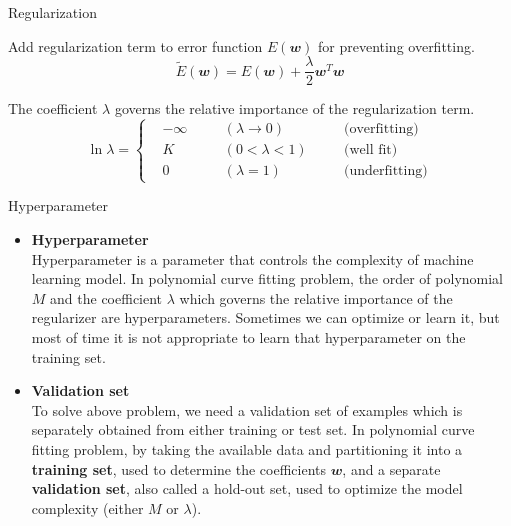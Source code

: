 \documentclass{bredelebeamer}
\begin{document}
\begin{frame}{Regularization}
  \begin{justify}
    Add regularization term to error function $E(\mathbfit{w})$ for preventing
    overfitting.
    \begin{equation}
      \tilde{E}(\mathbfit{w})=E(\mathbfit{w})+\frac{\lambda}{2}\mathbfit{w}^{T}\mathbfit{w}
    \end{equation}

    The coefficient $\lambda$ governs the relative importance of the
    regularization term.
    \begin{equation}
      \ln\lambda=\left\{\begin{aligned}
        & {-\infty} \quad && (\lambda\rightarrow0) \quad && \text{(overfitting)}  \\
        & {K}       \quad && (0<\lambda<1)         \quad && \text{(well fit)}     \\
        & {0}       \quad && (\lambda=1)           \quad && \text{(underfitting)}
      \end{aligned}\right.
    \end{equation}
  \end{justify}
\end{frame}

\begin{frame}{Hyperparameter}
  \begin{itemize}
    \item\begin{justify}
    \textbf{Hyperparameter} \\
    Hyperparameter is a parameter that controls the complexity of machine learning
    model. In polynomial curve fitting problem, the order of polynomial $M$ and the
    coefficient $\lambda$ which governs the relative importance of the regularizer
    are hyperparameters. Sometimes we can optimize or learn it, but most of time it
    is not appropriate to learn that hyperparameter on the training set.
    \end{justify}
    \item\begin{justify}
    \textbf{Validation set} \\
    To solve above problem, we need a validation set of examples which is separately
    obtained from either training or test set. In polynomial curve fitting problem,
    by taking the available data and partitioning it into a \textbf{training set},
    used to determine the coefficients $\mathbfit{w}$, and a separate
    \textbf{validation set}, also called a hold-out set, used to optimize the model
    complexity (either $M$ or $\lambda$).
    \end{justify}
  \end{itemize}
\end{frame}
\end{document}
